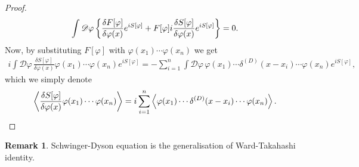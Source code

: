 \documentclass{article}
\theoremstyle{definition}
\newtheorem{remark}{Remark}[section]
\numberwithin{equation}{section}
\newcommand{\fivarphi}{\int \mathscr{D} \varphi\,}
\begin{document}
\begin{proof}
\begin{align}
    \fivarphi \qty{\frac{\delta F[\varphi]}{\delta\varphi(x)} e^{iS[\varphi]} + F[\varphi] i\frac{\delta S[\varphi]}{\delta \varphi(x)} e^{iS[\varphi]}} = 0.
  \end{align}
  Now, by substituting $F[\varphi]$ with $\varphi(x_1) \cdots \varphi(x_n)$ we get
  \begin{align}
    i\fivarphi \frac{\delta S[\varphi]}{\delta\varphi(x)}  \varphi(x_1) \cdots \varphi(x_n) e^{iS[\varphi]}
    = - \sum_{i = 1}^{n} \fivarphi \varphi(x_1) \cdots \delta^{(D)}(x - x_i) \cdots \varphi(x_n) e^{iS[\varphi]},
  \end{align}
  which we simply denote
  \begin{align}
    \ev{\frac{\delta S[\varphi]}{\delta\varphi(x)}  \varphi(x_1) \cdots \varphi(x_n)}
    = i \sum_{i = 1}^{n} \ev{\varphi(x_1) \cdots \delta^{(D)}(x - x_i) \cdots \varphi(x_n)}.
  \end{align}
\end{proof}

\begin{remark}
  Schwinger-Dyson equation is the generalisation of Ward-Takahashi identity.
\end{remark}
\end{document}
